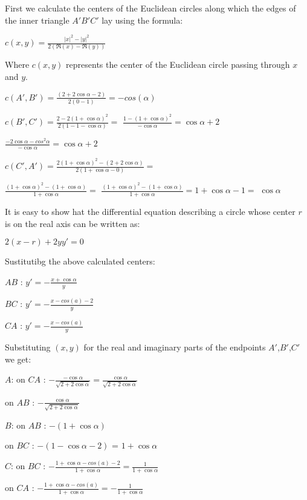 \documentclass[a4paper,10pt]{article}
\begin{document}
First we calculate the centers of the Euclidean circles along which the edges
of the inner triangle $A'B'C'$ lay using the formula:

\begin{center}
  $c\left(x,y\right) = \frac{\left|x\right|^{2} - \left|y\right|^{2}}{2\left(\Re(x) - \Re(y)\right)} $
\end{center}

Where $c\left(x,y\right)$ represents the center of the Euclidean circle passing
through $x$ and $y$.

  $c\left(A',B'\right) = \frac{\left(2 + 2\cos{\alpha} - 2\right)}{{2\left(0 - 1\right)}} = -cos(\alpha) $

  $c\left(B',C'\right) = \frac{2 - 2\left(1 + \cos{\alpha}\right)^2}{2\left(1 - 1 - \cos{\alpha}\right)} = $
  $ \frac{1 - \left(1 + \cos{\alpha}\right)^2}{-\cos{\alpha}} = \cos{\alpha} + 2$

  $ \frac{-2\cos{\alpha} - cos^{2}{\alpha}}{-\cos{\alpha}} = \cos{\alpha} + 2$

  $c\left(C',A'\right) = \frac{2\left(1 + \cos{\alpha} \right)^2 - \left(2 + 2\cos{\alpha}\right)}{2\left(1+\cos{\alpha} - 0\right)} =$

  $\frac{\left(1 + \cos{\alpha} \right)^2 - \left(1 + \cos{\alpha}\right)}{1+\cos{\alpha}} =$
  $\frac{\left(1 + \cos{\alpha} \right)^2 - \left(1 + \cos{\alpha}\right)}{1+\cos{\alpha}} = 1 + \cos{\alpha} - 1 = $
  $\cos{\alpha}$

It is easy to show hat the differential equation describing a circle whose center
$r$ is on the real axis can be written as:

$2\left(x-r\right)+2yy'=0$

Sustitutibg the above calculated centers:
  
\noindent $AB$ :  $y' = -\frac{x + \cos{\alpha}}{ y} $

\noindent $BC$ :  $y' = -\frac{x - cos\left(a\right) - 2}{y}$

\noindent $CA$ :  $y' = -\frac{x - cos\left(a\right)}{y}$


Substituting $(x,y)$ for the real and imaginary parts of the endpoints $A'$,$B'$,$C'$ we get:

\noindent $A$: 
on $CA$ : $-\frac{-\cos{\alpha}}{\sqrt{2 + 2 \cos{\alpha}}} = \frac{\cos{\alpha}}{\sqrt{2 + 2 \cos{\alpha}}}$

on $AB$ : $-\frac{\cos{\alpha}}{\sqrt{2 + 2 \cos{\alpha}}}$

\noindent $B$: 
on $AB$ : $-\left(1 + \cos{\alpha}\right)$

on $BC$ : $-\left(1 - \cos{\alpha} - 2\right)$ =  $1 + \cos{\alpha}$

\noindent $C$: 
on $BC$ : $-\frac{1 + \cos{\alpha} - cos\left(a\right) - 2}{1 + \cos{\alpha}} = \frac{1}{1 + \cos{\alpha}}$

on $CA$ : $-\frac{1 + \cos{\alpha} - cos\left(a\right)    }{1 + \cos{\alpha}} = -\frac{1}{1 + \cos{\alpha}}$
\end{document}
